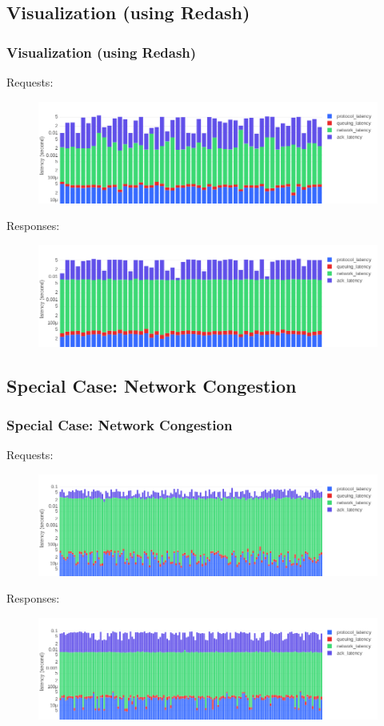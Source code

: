\documentclass[10pt]{beamer}
\begin{document}
\subsection{Visualization (using Redash)}
\begin{frame}
\frametitle{Visualization (using Redash)}
Requests:
\begin{figure}
\includegraphics[width=\linewidth]{grpc-requests-latencies}
\end{figure}
Responses:
\begin{figure}
\includegraphics[width=\linewidth]{grpc-responses-latencies}
\end{figure}
\end{frame}

\subsection{Special Case: Network Congestion}
\begin{frame}
\frametitle{Special Case: Network Congestion}
Requests:
\begin{figure}
\includegraphics[width=\linewidth]{congested-requests}
\end{figure}
Responses:
\begin{figure}
\includegraphics[width=\linewidth]{congested-responses}
\end{figure}
\end{frame}
\end{document}

